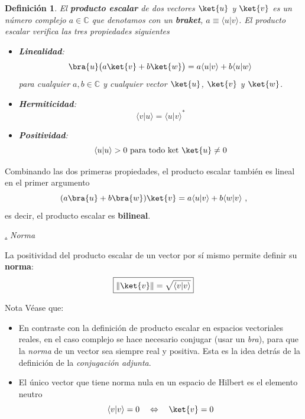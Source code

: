 \documentclass[a4paper,11pt]{book} %
\newtheorem{definicion_contador}{Definición}
\newcommand{\Definicion}[1]{
		\begin{mybox_gray2}{}
			\begin{definicion_contador}
				 #1 
			\end{definicion_contador} 
		\end{mybox_gray2}
	}
\numberwithin{equation}{chapter}
\newcommand{\braket}[2]{\langle #1|#2\rangle}
\def\subsubiContadorIt{\par\addtocounter{subsubsection}{1}\underline{\it\thesubsubsection.}\hskip0.5cm \setcounter{subsubsubsectionIt}{0}}
\newcommand{\SubsubiIt}[1]{
		\subsubiContadorIt \textit{#1}
	}
\newcounter{subsubsubsectionIt}[subsubsection]
\begin{document}
	\Definicion{
	El \textbf{producto escalar} de dos vectores $\ket{u}$ y $\ket{v}$ es un \textit{número complejo} $a\in{\mathbb C}$ que denotamos con un \textbf{braket}, $a \equiv \braket{u}{v} $. El producto escalar verifica las tres propiedades siguientes
	\begin{itemize}
	\item \textbf{Linealidad}: 
		\begin{equation}
		\bra{u}\big(a\ket{v}+b\ket{w}\big) = a\braket{u}{v} + b\braket{u}{w}
		\end{equation}	
		para cualquier $a,b \in  \mathbb{C}$ y cualquier vector $\ket{u}$, $\ket{v}$ y $\ket{w}$.
		
	\item \textbf{Hermiticidad}: 
		\begin{equation}
		\braket{v}{u} = \braket{u}{v}^*
		\end{equation}
	\item \textbf{Positividad}: 
		\begin{equation}
		\braket{u}{u} >0 \text{ para todo ket } \ket{u}\neq 0
		\end{equation}	
	\end{itemize}
	}
Combinando las dos primeras propiedades, el producto escalar también es lineal en el primer argumento
\begin{equation}
(a\bra{u}+b\bra{w})\ket{v} = a\braket{u}{v} + b\braket{w}{v}~,
\end{equation}
es decir, el producto escalar es \textbf{bilineal}.


			\SubsubiIt{Norma}

La positividad del producto escalar de un vector por sí mismo permite definir su \textbf{norma}:
	\begin{equation}
	\boxed{\|\ket{v}\| = \sqrt{\braket{v}{v}}}
	\end{equation}

	\begin{mybox_blue}{Nota}
	Véase que:
	\begin{itemize}
		\item En contraste con la definición de producto escalar en espacios vectoriales reales, en el caso complejo se hace necesario conjugar (usar un  \textit{bra}), para  que la \textit{norma} de un vector sea siempre real y positiva. Esta es la idea detrás de la definición de la \textit{conjugación adjunta}.
		
		\item El único vector que tiene norma nula en un espacio de Hilbert es el elemento neutro
	\begin{equation}
	\braket{v}{v} = 0 ~~~ \Leftrightarrow ~~~\ket{v} = 0
	\end{equation}
	\end{itemize}
	\end{mybox_blue}
\end{document}
